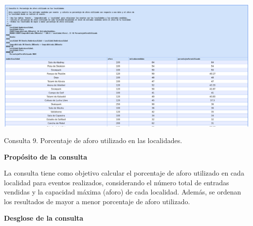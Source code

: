 \begin{center}
	\includegraphics[width=16.5cm]{resources/Chapters/Consultas/Imagenes/Consulta9.jpg} 
	
	Consulta 9. Porcentaje de aforo utilizado en las localidades.
\end{center}

\textbf{Propósito de la consulta}

La consulta tiene como objetivo calcular el porcentaje de aforo utilizado en cada localidad para eventos realizados, considerando el número total de entradas vendidas y la capacidad máxima (aforo) de cada localidad. Además, se ordenan los resultados de mayor a menor porcentaje de aforo utilizado.

\textbf{Desglose de la consulta}

